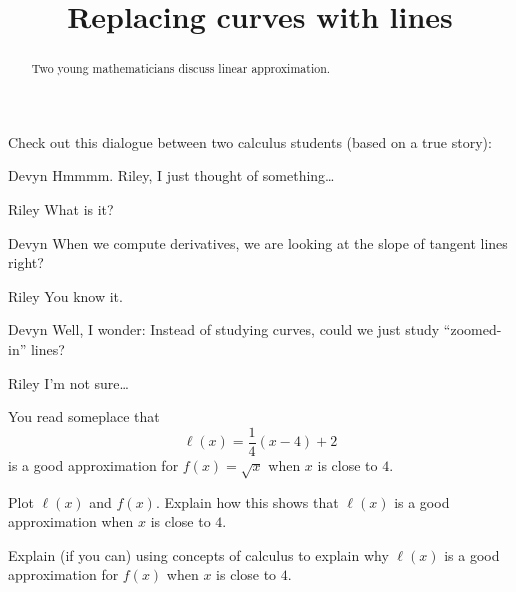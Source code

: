 \documentclass{ximera}
\title[Break-Ground:]{Replacing curves with lines}
\begin{document}
\begin{abstract}
Two young mathematicians discuss linear approximation.
\end{abstract}
\maketitle

Check out this dialogue between two calculus students (based on a true
story):



\begin{dialogue}
\item[Devyn] Hmmmm. Riley, I just thought of something\dots
\item[Riley] What is it?
\item[Devyn] When we compute derivatives, we are looking at the slope
  of tangent lines right?
\item[Riley] You know it.
\item[Devyn] Well, I wonder: Instead of studying curves, could we just
  study ``zoomed-in'' lines?
\item[Riley] I'm not sure\dots
\end{dialogue}


You read someplace that
\[
\ell(x) = \frac{1}{4}(x-4)+2
\]
is a good approximation for $f(x) = \sqrt{x}$ when $x$ is close to
$4$.

\begin{problem}
  Plot $\ell(x)$ and $f(x)$. Explain how this shows that $\ell(x)$ is a
  good approximation when $x$ is close to $4$.
  \begin{prompt}
  \begin{freeResponse}
  \end{freeResponse}
  \end{prompt}
\end{problem}

\begin{problem}
 Explain (if you can) using concepts of calculus to explain why
 $\ell(x)$ is a good approximation for $f(x)$ when $x$ is close to $4$.
 \begin{prompt}
  \begin{freeResponse}
  \end{freeResponse}
 \end{prompt}
\end{problem}




%
\end{document}
